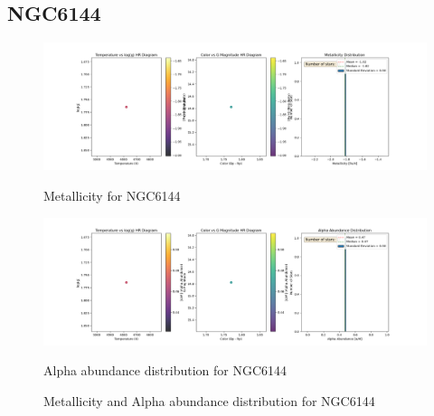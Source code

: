\documentclass[a4paper,12pt]{article}
\begin{document}
\subsection{NGC6144}
\begin{figure}[H]
    \centering
    \begin{minipage}[b]{0.8\textwidth}
        \centering
        \includegraphics[width=\textwidth]{NGC6144_metalicity.png}
        \caption{Metallicity for NGC6144}
        \label{fig:NGC6144_metalicity}
    \end{minipage}
    \hfill
    \begin{minipage}[b]{0.8\textwidth}
        \centering
        \includegraphics[width=\textwidth]{NGC6144_alpha.png}
        \caption{Alpha abundance distribution for NGC6144}
        \label{fig:NGC6144_alpha}
    \end{minipage}
    \caption{Metallicity and Alpha abundance distribution for NGC6144}
    \label{fig:NGC6144_combined}
\end{figure}
\clearpage
\end{document}
